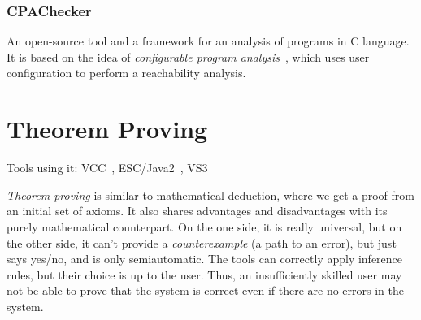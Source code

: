\subsubsection{CPAChecker}
An open-source tool and a framework for an analysis of programs in C language. It is based on the idea of {\em configurable program analysis}~\cite{CPAChecker}, which uses user configuration to perform a reachability analysis.


\section{Theorem Proving}\label{chap:fav:theoremProving}
Tools using it: VCC~\cite{KrenaVojnarOverview}, ESC/Java2~\cite{KrenaVojnarOverview}, VS3~\cite{KrenaVojnarOverview}

{\em Theorem proving} is similar to mathematical deduction, where we get a proof from an initial set of axioms. It also shares advantages and disadvantages with its purely mathematical counterpart. On the one side, it is really universal, but on the other side, it can't provide a {\em counterexample} (a path to an error), but just says yes/no, and is only semiautomatic. The tools can correctly apply inference rules, but their choice is up to the user. Thus, an insufficiently skilled user may not be able to prove that the system is correct even if there are no errors in the system.


